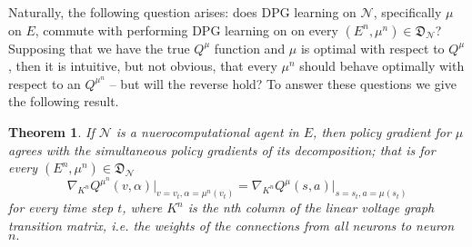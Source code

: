 \documentclass{article} %
\newtheorem{theorem}{Theorem}
\numberwithin{equation}{subsection}
\numberwithin{theorem}{subsection}
\theoremstyle{named}
\def\scriptn{{\mathcal N}}
\begin{document}
Naturally, the following question arises: does DPG learning on $\scriptn$, specifically $\mu$ on $E$, commute with performing DPG learning on on every $(E^n, \mu^n) \in \mathfrak{D}_\scriptn$? Supposing that we have the true $Q^\mu$ function and $\mu$ is optimal with respect to $Q^\mu$, then it is intuitive, but not obvious, that every $\mu^n$ should behave optimally with respect to an $Q^{\mu^n}$ -- but will the reverse hold? To answer these questions we give the following result.
\begin{theorem}
    If $\scriptn$ is a nuerocomputational agent in $E$, then policy gradient for $\mu$ agrees with the simultaneous policy gradients of its decomposition; that is for every $(E^n, \mu^n) \in \mathfrak{D}_\scriptn$
    \begin{equation}
        \nabla_{K^n} Q^{\mu^n}(v,\alpha)\Big|_{v=v_t,\alpha=\mu^n(v_t)} =\nabla_{K^n} Q^{\mu}(s,a)\Big|_{s=s_t,a=\mu(s_t)}
    \end{equation}
    for every time step $t$, where $K^n$ is the nth column of the linear voltage graph transition matrix, i.e. the weights of the connections from all neurons to neuron $n.$
\end{theorem}
\end{document}
